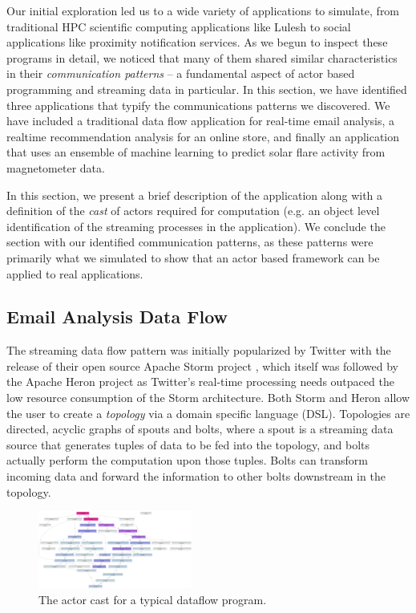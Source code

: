 \documentclass[conference,twocolumn,10pt]{IEEEtran}
\begin{document}
Our initial exploration led us to a wide variety of applications to simulate, from traditional HPC scientific computing applications like Lulesh to social applications like proximity notification services. As we begun to inspect these programs in detail, we noticed that many of them shared similar characteristics in their \textit{communication patterns} -- a fundamental aspect of actor based programming and streaming data in particular. In this section, we have identified three applications that typify the communications patterns we discovered. We have included a traditional data flow application for real-time email analysis, a realtime recommendation analysis for an online store, and finally an application that uses an ensemble of machine learning to predict solar flare activity from magnetometer data.

In this section, we present a brief description of the application along with a definition of the \textit{cast} of actors required for computation (e.g. an object level identification of the streaming processes in the application). We conclude the section with our identified communication patterns, as these patterns were primarily what we simulated to show that an actor based framework can be applied to real applications.

\subsection{Email Analysis Data Flow}

The streaming data flow pattern was initially popularized by Twitter with the release of their open source Apache Storm project \cite{toshniwal_storm_2014}, which itself was followed by the Apache Heron project \cite{kulkarni_twitter_2015} as Twitter's real-time processing needs outpaced the low resource consumption of the Storm architecture. Both Storm and Heron allow the user to create a \textit{topology} via a domain specific language (DSL). Topologies are directed, acyclic graphs of spouts and bolts, where a spout is a streaming data source that generates tuples of data to be fed into the topology, and bolts actually perform the computation upon those tuples. Bolts can transform incoming data and forward the information to other bolts downstream in the topology.

\begin{figure}[!h]
    \centering
    \includegraphics[width=0.45\textwidth]{dataflow_cast}
    \caption{The actor cast for a typical dataflow program.}
    \label{fig:dataflow_cast}
\end{figure}
\end{document}
